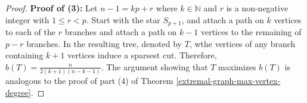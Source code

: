 \documentclass[12pt]{article}
\begin{document}
\begin{proof}





\noindent\textbf{Proof of (3):} Let $n-1=kp+r$ where $k\in \mathbb{N}$ and $r$ is a non-negative integer with $1 \leq r < p$. Start with the star $S_{p+1}$, and attach a path on $k$ vertices to each of the $r$ branches and attach a path on $k-1$ vertices to the remaining of $p-r$ branches.  In the resulting tree, denoted by $T$, wthe vertices of any branch containing $k+1$ vertices induce a sparsest cut. Therefore, $b(T)=\frac{n}{2(k+1)(n-k-1)}$. The argument showing that $T$ maximizes $b(T)$ is analogous to the proof of part (4) of Theorem \ref{extremal-graph-max-vertex-degree}.


\end{proof}
\end{document}
